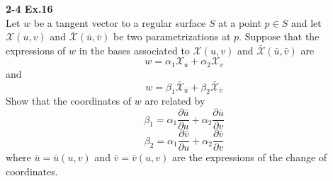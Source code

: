 \documentclass{article}
\begin{document}
\par
\textbf{2-4 Ex.16}\\
Let $w$ be a tangent vector to a regular surface $S$ at a
point $p \in S$ and let $\mathcal{X}(u,v)$ and $\bar{\mathcal{X}}(\bar{u}, \bar{v})$
be two parametrizations at $p$. Suppose that the
expressions of $w$ in the bases associated to $\mathcal{X}(u,v)$
and $\bar{\mathcal{X}}(\bar{u}, \bar{v})$ are
$$
    w = \alpha_1 \mathcal{X}_u + \alpha_2 \mathcal{X}_v
$$
and
$$
    w = \beta_1 \bar{\mathcal{X}}_{\bar{u}} +\beta_2 \bar{\mathcal{X}}_{\bar{v}}
$$
Show that the coordinates of $w$ are related by
$$
    \beta_1 = \alpha_1 \frac{\partial{\bar{u}}}{\partial{u}} + \alpha_2 \frac{\partial{\bar{u}}}{\partial{v}}
$$
$$
    \beta_2 = \alpha_1 \frac{\partial{\bar{v}}}{\partial{u}} + \alpha_2 \frac{\partial{\bar{v}}}{\partial{v}}
$$
where $\bar{u}=\bar{u}(u,v)$ and $\bar{v}=\bar{v}(u,v)$
are the expressions of the change of coordinates.
\end{document}
